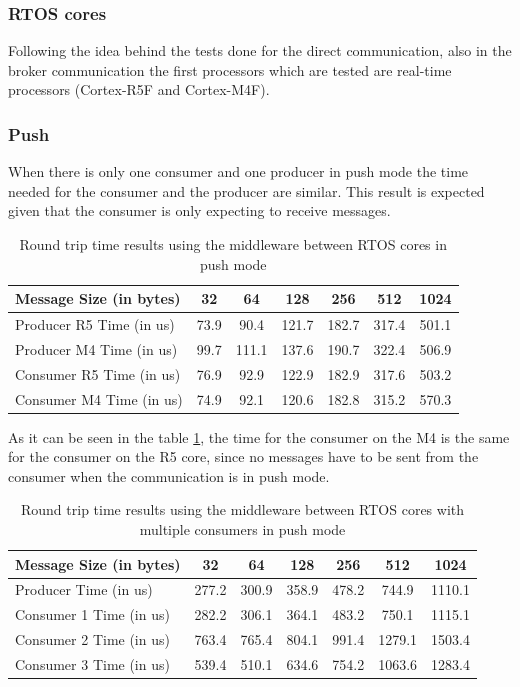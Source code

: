 \subsubsection{RTOS cores}

Following the idea behind the tests done for the direct communication, also in
the broker communication the first processors which are tested are real-time
processors (Cortex-R5F and Cortex-M4F).

\subsubsection{Push}

When there is only one consumer and one producer in push mode the time needed
for the consumer and the producer are similar.
This result is expected given that the consumer is only expecting to receive
messages.

\begin{table}[H]
\centering
\caption{Round trip time results using the middleware between RTOS cores in
         push mode}
\label{table:broker_communication_RTOS_cores_push}
\begin{tabular}{lcccccc}
\toprule
Message Size (in bytes) & 32 & 64 & 128 & 256 & 512 & 1024 \\
\midrule
Producer R5 Time (in us) & 73.9 & 90.4 & 121.7 & 182.7 & 317.4 & 501.1 \\
Producer M4 Time (in us) & 99.7 & 111.1 & 137.6 & 190.7 & 322.4 & 506.9 \\
Consumer R5 Time (in us) & 76.9 & 92.9 & 122.9 & 182.9 & 317.6 & 503.2 \\
Consumer M4 Time (in us) & 74.9 & 92.1 & 120.6 & 182.8 & 315.2 & 570.3 \\
\bottomrule
\end{tabular}
\end{table}

As it can be seen in the table \ref{table:broker_communication_RTOS_cores_push},
the time for the consumer on the M4 is the same for the consumer on the R5 core,
since no messages have to be sent from the consumer when the communication is
in push mode.

\begin{table}[H]
\centering
\caption{Round trip time results using the middleware between RTOS cores with
         multiple consumers in push mode}
\label{table:broker_communication_RTOS_cores_multiple_consumers_push}
\begin{tabular}{lcccccc}
\toprule
Message Size (in bytes) & 32 & 64 & 128 & 256 & 512 & 1024 \\
\midrule
Producer Time (in us) & 277.2 & 300.9 & 358.9 & 478.2 & 744.9 & 1110.1 \\
Consumer 1 Time (in us) & 282.2 & 306.1 & 364.1 & 483.2 & 750.1 & 1115.1 \\
Consumer 2 Time (in us) & 763.4 & 765.4 & 804.1 & 991.4 & 1279.1 & 1503.4 \\
Consumer 3 Time (in us) & 539.4 & 510.1 & 634.6 & 754.2 & 1063.6 & 1283.4 \\
\bottomrule
\end{tabular}
\end{table}

